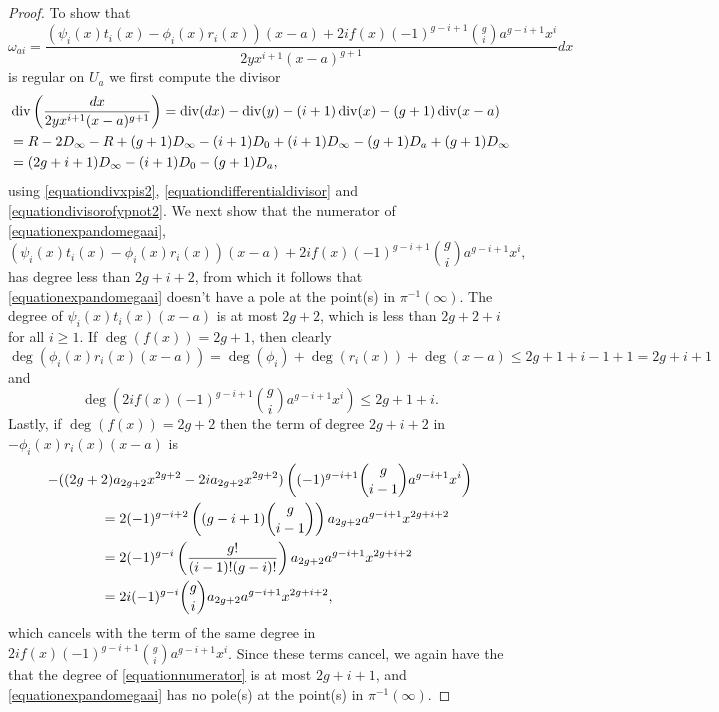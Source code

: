 \begin{proof}
    To show that
        \begin{equation}\label{equationexpandomegaai}
        \omega_{a i} =  \frac{(\psi_i(x)t_i(x) - \phi_i(x)r_i(x))(x-a) + 2if(x)(-1)^{g-i+1}\binom{g}{i} a^{g-i+1}x^i}{2yx^{i+1}(x-a)^{g+1}}dx
        \end{equation}
    is regular on $U_a$ we first compute the divisor
        \begin{align*}
        & \operatorname{div}\left( \frac{dx}{2yx^{i+1}(x-a)^{g+1}}\right)  = \operatorname{div}(dx) - \operatorname{div}(y) - (i+1)\operatorname{div}(x) - (g+1)\operatorname{div}(x-a) \\
        & = R - 2D_\infty - R + (g+1)D_\infty - (i+1)D_0 + (i+1)D_\infty  - (g+1)D_a + (g+1)D_\infty \\
        & = (2g+i+1)D_\infty -(i+1)D_0 - (g+1)D_a,
        \end{align*}
    using \eqref{equationdivxpis2}, \eqref{equationdifferentialdivisor} and \eqref{equationdivisorofypnot2}.
    We next show that the numerator of \eqref{equationexpandomegaai},
        \begin{equation}\label{equationnumerator}
        {(\psi_i(x)t_i(x) - \phi_i(x)r_i(x))(x-a) + 2if(x)(-1)^{g-i+1}\binom{g}{i} a^{g-i+1}x^i},
        \end{equation}
    has degree less than $2g+i+2$, from which it follows that \eqref{equationexpandomegaai} doesn't have a pole at the point(s) in $\pi^{-1}(\infty)$.
    The degree of $\psi_i(x)t_i(x)(x-a)$ is at most $2g+2$, which is less than $2g+2+i$ for all $i \geq 1$.
    If $\deg(f(x)) = 2g+1$, then clearly
        \[
        \deg\left( \phi_i(x)r_i(x)(x-a) \right) = \deg(\phi_i) + \deg(r_i(x)) + \deg(x-a) \leq 2g+1 + i-1 +1 = 2g+i+1
        \]
    and
        \[
        \deg \left( 2if(x)(-1)^{g-i+1}\binom{g}{i} a^{g-i+1}x^i \right)  \leq  2g+1+i .
        \]
    Lastly, if $\deg(f(x)) = 2g+2$ then the term of degree $2g+i+2$ in $-\phi_i(x)r_i(x)(x-a)$ is
        \begin{align*}
        -& ((2g+2)a_{2g+2}x^{2g+2}-2ia_{2g+2}x^{2g+2})\left( (-1)^{g-i+1}\binom{g}{i-1}a^{g-i+1}x^i\right) \\
         & \hskip 3em  = 2(-1)^{g-i+2}\left( (g-i+1)\binom{g}{i-1} \right) a_{2g+2}a^{g-i+1}x^{2g+i+2} \\
         & \hskip 3em = 2(-1)^{g-i} \left( \frac{g!}{(i-1)!(g-i)!} \right) a_{2g+2}a^{g-i+1}x^{2g+i+2} \\
         & \hskip 3em = 2i(-1)^{g-i}\binom{g}{i}a_{2g+2}a^{g-i+1}x^{2g+i+2},
        \end{align*}
    which cancels with the term of the same degree in $2if(x)(-1)^{g-i+1}\binom{g}{i}a^{g-i+1}x^i$.
    Since these terms cancel, we again have the that the degree of \eqref{equationnumerator} is at most $2g+i+1$, and \eqref{equationexpandomegaai} has no pole(s) at the point(s) in $\pi^{-1}(\infty)$.
    

\end{proof}
